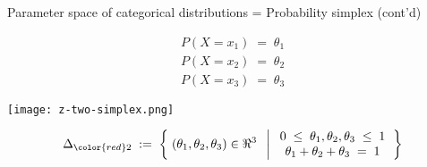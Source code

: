 \begin{frame}{\Large Parameter space of categorical distributions = Probability simplex (cont'd)}

\begin{multicols}{2}

\begin{minipage}{5cm}
\vskip 1.5cm
\begin{equation*}
\begin{array}{c}
P(X=x_{1}) \;=\; \theta_{1} \\
P(X=x_{2}) \;=\; \theta_{2} \\
P(X=x_{3}) \;=\; \theta_{3}
\end{array}
\end{equation*}
\end{minipage}

\newpage

\begin{minipage}{5cm}
\begin{center}
\texttt{[image: z-two-simplex.png]}
\end{center}
\end{minipage}

\end{multicols}

\vskip -0.2cm
\begin{equation*}
\Delta_{\color{red}2}
\; := \;
\left\{\;
(\theta_{1},\theta_{2},\theta_{3}) \in \Re^{3}
\;\;\left\vert\;
\begin{array}{c}
	0 \;\leq\; \theta_{1}, \theta_{2}, \theta_{3} \;\leq\; 1 \\
	\theta_{1} + \theta_{2} + \theta_{3} \;=\; 1
\end{array}
\right.
\right\}
\end{equation*}

\end{frame}
\normalsize


